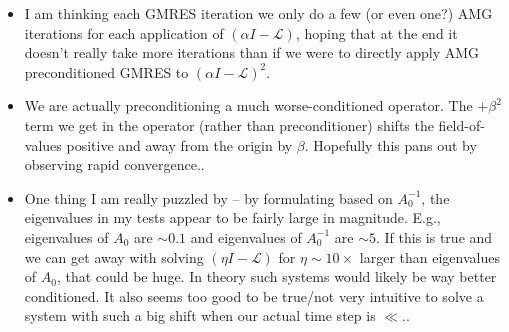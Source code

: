 \documentclass[review]{siamart}
\begin{document}
{\color{blue}
\begin{itemize}
	\item I am thinking each GMRES iteration we only do a few (or even one?) AMG iterations
	for each application of $(\alpha I - \mathcal{L})$, hoping that at the end it doesn't
	really take more iterations than if we were to directly apply AMG preconditioned GMRES
	to $(\alpha I - \mathcal{L})^2$.

	\item We are actually preconditioning a much worse-conditioned operator. The $+\beta^2$
	term we get in the operator (rather than preconditioner) shifts the field-of-values 
	positive and away from the origin by $\beta$. Hopefully this pans out by observing
	rapid convergence..

	\item One thing I am really puzzled by -- by formulating based on $A_0^{-1}$, the
	eigenvalues in my tests appear to be fairly large in magnitude. E.g., eigenvalues of
	$A_0$ are $\sim 0.1$ and eigenvalues of $A_0^{-1}$ are $\sim 5$. If this is true and we
	can get away with solving $(\eta I -\mathcal{L})$ for $\eta \sim 10\times$ larger than
	eigenvalues of $A_0$, that could be huge. In theory such systems would likely be way
	better conditioned. It also seems too good to be true/not very intuitive to solve a
	system with such a big shift when our actual time step is $\ll$..

\end{itemize}
}




% 
% 
\end{document}
